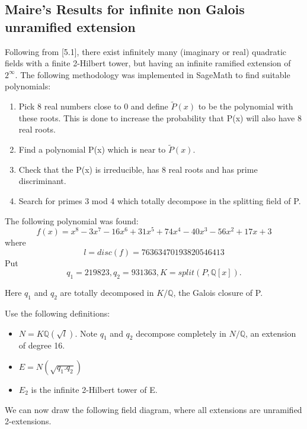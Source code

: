 \documentclass[12pt]{extarticle}
\newcommand{\<}{\langle}
\renewcommand{\>}{\rangle}
\theoremstyle{definition}
\begin{document}
\subsection{Maire's Results for infinite non Galois unramified extension}
Following from \cite{MAIR}[5.1], there exist infinitely many (imaginary or real) quadratic fields with a finite 2-Hilbert tower, but having an infinite ramified extension of $2^{\infty{}}$. 
The following methodology was implemented in SageMath to find suitable polynomials:
\begin{enumerate}
    \item Pick 8 real numbers close to 0 and define $\tilde{P}(x)$ to be the polynomial with these roots. This is done to increase the probability that P(x) will also have 8 real roots. 
    \item Find a polynomial P(x) which is near to $\tilde{P}(x)$.
    \item Check that the P(x) is irreducible, has 8 real roots and has prime discriminant. 
    \item Search for primes 3 mod 4 which totally decompose in the splitting field of P. 
\end{enumerate}
The following polynomial was found: 
\begin{equation}
    f(x) = x^8 - 3x^7 - 16x^6 + 31x^5 + 74x^4 - 40x^3 - 56x^2 + 17x + 3
\end{equation}
where 
\begin{equation}
    l = disc(f) = 76363470193820546413
\end{equation}
Put \begin{equation}
    q_1 = 219823, q_2 = 931363, K = split(P, \mathbb{Q}[x]).
\end{equation}
\par
Here $q_1$ and  $q_2$ are totally decomposed in $K/\mathbb{Q}$, the Galois closure of P.
\par
Use the following definitions: 
\begin{itemize}
    \item $N = K\mathbb{Q}(\sqrt{l})$. Note $q_1$ and $q_2$ decompose completely in $N/\mathbb{Q}$, an extension of degree 16.
    \item $E = N(\sqrt{q_1.q_2})$
    \item $E_2$ is the infinite 2-Hilbert tower of E.
\end{itemize}
\par 
We can now draw the following field diagram, where all extensions are unramified 2-extensions. 
\end{document}
